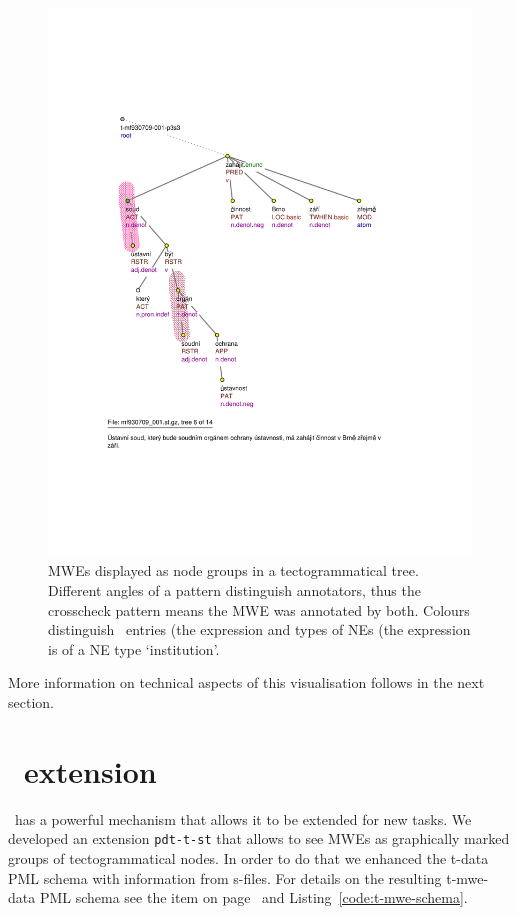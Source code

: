 \begin{figure}[htbp]
   \centering
   \includegraphics[width=\textwidth]{images/bubliny.pdf} 
   \caption{MWEs displayed as node groups in a tectogrammatical tree. Different angles of a pattern distinguish annotators, thus the crosscheck pattern means the MWE was annotated by both. Colours distinguish \semlex\ entries (the expression  and types of NEs (the expression  is of a NE type `institution'.}
   \label{fig:nodegroups}
\end{figure}

More information on technical aspects of this visualisation follows in the next section.

\section{\tred\ extension}
\label{sec:s:ext}

\tred\ has a powerful mechanism that allows it to be extended for new tasks. We developed an extension \texttt{pdt-t-st} that allows to see MWEs as graphically marked groups of tectogrammatical nodes. In order to do that we enhanced the t-data PML schema with information from s-files. For details on the resulting t-mwe-data PML schema see the item  on page~\pageref{item:t-mwe-schema} and Listing~\ref{code:t-mwe-schema}.

